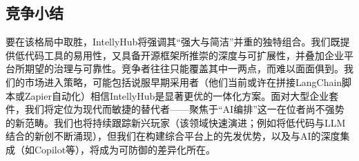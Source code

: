 \documentclass[11pt, a4paper, oneside]{article}
\begin{document}
\subsection{竞争小结}
要在该格局中取胜，IntellyHub将强调其“强大与简洁”并重的独特组合。我们既提供低代码工具的易用性，又具备开源框架所推崇的深度与可扩展性，并叠加企业平台所期望的治理与可靠性。竞争者往往只能覆盖其中一两点，而难以面面俱到。我们的市场进入策略，可能包括说服早期采用者（他们当前或许在拼接LangChain脚本或Zapier自动化）相信IntellyHub是显著更优的一体化方案。面对大型企业套件，我们将定位为现代而敏捷的替代者——聚焦于“AI编排”这一在位者尚不强势的新范畴。我们也将持续跟踪新兴玩家（该领域快速演进；例如将低代码与LLM结合的新创不断涌现），但我们在构建综合平台上的先发优势，以及与AI的深度集成（如Copilot等），将成为可防御的差异化所在。


\end{document}

